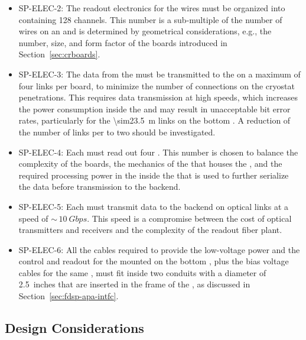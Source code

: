 \begin{itemize}
\item SP-ELEC-2: The readout electronics for the  wires must be organized
into  containing 128 channels. This number is a sub-multiple
of the number of wires on an  and is %
determined
by geometrical considerations, e.g., the number, size, and form
factor of the  boards introduced in Section~\ref{sec:crboards}.

\item SP-ELEC-3: The data from the  must be transmitted to the
 on a maximum of four links per board, to minimize
the number of connections on the cryostat penetrations. This 
requires data transmission at high speeds, which %
increases the power consumption inside the  and %
may result in unacceptable bit error rates, particularly for the 
\SI{\sim23.5}{m} links on %
the bottom . A reduction of
the number of links per  to two should be investigated. 

\item SP-ELEC-4: Each  must read out four . This number
is chosen to %
balance %
the complexity of the boards, the mechanics
of the  that houses the , and the 
required processing power in the  inside the
   that is used to further serialize the data 
before transmission to the  backend.

\item SP-ELEC-5: Each  must transmit data to the 
backend on optical links at a speed of $\sim\,\SI{10}{Gbps}$. This speed 
is a compromise between the cost of optical transmitters and
receivers and the complexity of the readout fiber plant.

\item SP-ELEC-6: All the cables required to provide the low-voltage power
and the control and readout for the  mounted on
the bottom , plus the bias voltage cables for
the same , must fit inside two conduits with a
diameter of \SI{2.5}{inches} that are inserted in the frame of
the , as discussed in Section~\ref{sec:fdsp-apa-intfc}.
\end{itemize}

\subsection{Design Considerations}
\label{sec:fdsp-tpcelec-overview-design}

